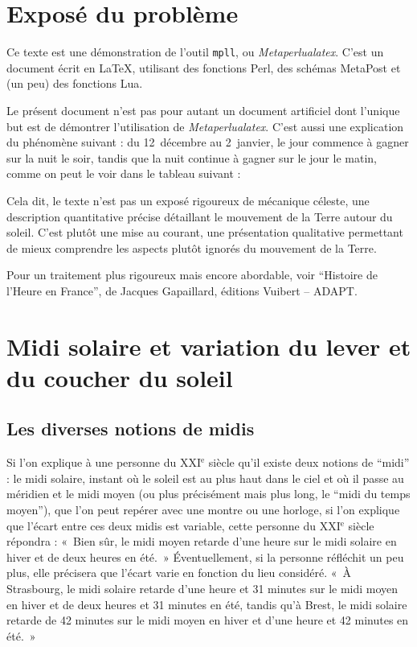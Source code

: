 \documentclass[a4paper]{article}
\newenvironment{texte}{\rmfamily}{}
\newcommand{\fran}[0]{\selectlanguage{french}}
\newcommand{\ee}[0]{$^\mathrm{e}$}
\begin{document}
\begin{texte}

\fran

\section{Exposé du problème}

Ce texte est une démonstration de l'outil \texttt{mpll}, ou 
\textit{Metaperlualatex}. C'est un document écrit en \LaTeX,
utilisant des fonctions Perl, des schémas MetaPost et (un peu)
des fonctions Lua.

Le présent document n'est pas pour autant un document artificiel
dont l'unique but est de démontrer l'utilisation de \textit{Metaperlualatex}.
C'est aussi une explication du phénomène suivant : du 12~décembre au 
2~janvier, le jour commence à gagner sur la nuit le
soir, tandis que la nuit continue à gagner sur le jour le matin,
comme on peut le voir dans le tableau suivant :

\vspace{2mm}
\vspace{2mm}

Cela dit, le texte n'est pas un exposé rigoureux de mécanique céleste,
une description quantitative précise détaillant le mouvement de la
Terre autour du soleil. C'est plutôt une mise au courant, une
présentation qualitative permettant de mieux comprendre les aspects
plutôt ignorés du mouvement de la Terre.

Pour un traitement plus rigoureux mais encore abordable, voir
``Histoire de l'Heure en France'', de Jacques Gapaillard, éditions
Vuibert -- ADAPT.

\section{Midi solaire et variation du lever et du coucher du soleil}

\subsection{Les diverses notions de midis}

Si l'on explique à une personne du XXI\ee{} siècle qu'il existe
deux notions de ``midi'' : le midi solaire, instant où le soleil
est au plus haut dans le ciel et où il passe au méridien et 
le midi moyen (ou plus précisément mais plus long, le
``midi du temps moyen''), que l'on peut repérer avec une montre ou une horloge,
si l'on explique que l'écart entre ces deux midis est variable,
cette personne du XXI\ee{} siècle répondra : «~Bien sûr, 
le midi moyen retarde d'une heure sur le midi solaire en hiver
et de deux heures en été.~» Éventuellement, si la personne réfléchit
un peu plus, elle précisera que l'écart varie en fonction du lieu
considéré. «~À Strasbourg, le midi solaire retarde d'une heure
et 31 minutes sur le midi moyen en hiver et de deux heures et
31 minutes en été, tandis qu'à Brest, le midi solaire retarde
de 42 minutes sur le midi moyen en hiver et d'une heure et 42 minutes
en été.~»


\end{texte}
\end{document}
